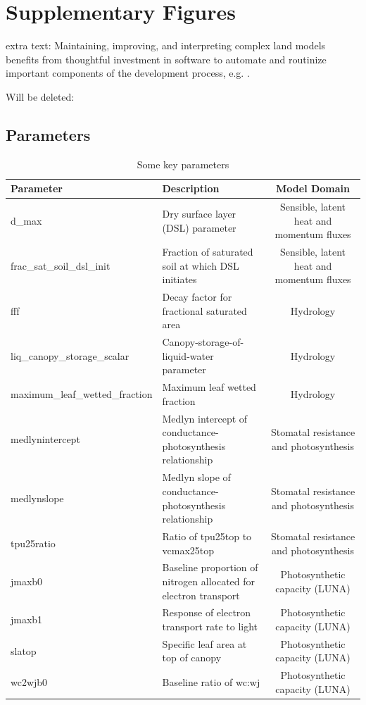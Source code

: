 \documentclass[draft]{agujournal2019}
\begin{document}


\appendix
\section{Supplementary Figures}


extra text:
Maintaining, improving, and interpreting complex land models benefits from thoughtful investment in software to automate and routinize important components of the development process, e.g. . 

Will be deleted:
\subsection{Parameters} 
\begin{landscape}
 \begin{table}[h]
 \caption{Some key parameters}
 \centering
 \begin{tabular}{l l c}
 \hline
  Parameter  & Description & Model Domain \\
 \hline
d\_max & Dry surface layer (DSL) parameter & Sensible, latent heat and momentum fluxes \\
frac\_sat\_soil\_dsl\_init & Fraction of saturated soil at which DSL initiates & Sensible, latent heat and momentum fluxes \\
fff & Decay factor for fractional saturated area & Hydrology \\
liq\_canopy\_storage\_scalar & Canopy-storage-of-liquid-water parameter & Hydrology \\
maximum\_leaf\_wetted\_fraction & Maximum leaf wetted fraction & Hydrology \\
medlynintercept & Medlyn intercept of conductance-photosynthesis relationship & Stomatal resistance and photosynthesis \\
medlynslope & Medlyn slope of conductance-photosynthesis relationship & Stomatal resistance and photosynthesis \\
tpu25ratio & Ratio of tpu25top to vcmax25top & Stomatal resistance and photosynthesis \\
jmaxb0 & Baseline proportion of nitrogen allocated for electron transport & Photosynthetic capacity (LUNA) \\
jmaxb1 & Response of electron transport rate to light & Photosynthetic capacity (LUNA) \\
slatop & Specific leaf area at top of canopy & Photosynthetic capacity (LUNA) \\
wc2wjb0 & Baseline ratio of wc:wj & Photosynthetic capacity (LUNA) \\

\end{tabular}
\end{table}
\end{landscape}
\end{document}

